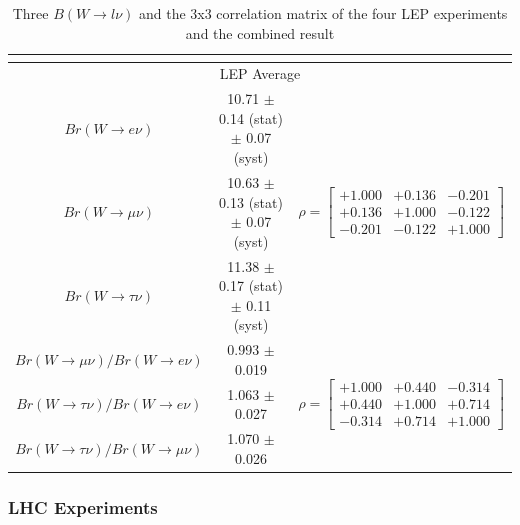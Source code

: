 \begin{table}[ht]
\begin{tabular}{ |c| c  c | }
         \multicolumn{3}{c}{} \\
         \hline
         \multicolumn{3}{|c|}{LEP Average \cite{Schael:2013ita}} \\
         \hline
         $Br(W\to e    \nu)$    & 10.71 $\pm$ 0.14 (stat) $\pm$ 0.07 (syst) & 
         \multirow{3}{*}{
            \begin{footnotesize}
            $\rho = \begin{bmatrix}
                +1.000 &+0.136 &-0.201 \\ 
                +0.136 &+1.000 &-0.122 \\
                -0.201 &-0.122 &+1.000 
            \end{bmatrix}$ 
            \end{footnotesize} 
         } \\
         $Br(W\to \mu  \nu)$    & 10.63 $\pm$ 0.13 (stat) $\pm$ 0.07 (syst) & \\ 
         $Br(W\to \tau \nu)$    & 11.38 $\pm$ 0.17 (stat) $\pm$ 0.11 (syst) & \\
         \hline
         $Br(W\to \mu  \nu)/ Br(W\to e \nu)$ & 0.993  $\pm$ 0.019 & 
         \multirow{3}{*}{
            \begin{footnotesize}
            $\rho = \begin{bmatrix}
                +1.000 &+0.440 &-0.314 \\ 
                +0.440 &+1.000 &+0.714 \\
                -0.314 &+0.714 &+1.000 
            \end{bmatrix}$ 
            \end{footnotesize} 
         } \\
         $Br(W\to \tau \nu)/ Br(W\to e \nu)$ & 1.063  $\pm$ 0.027 & \\
         $Br(W\to \tau \nu)/ Br(W\to\mu\nu)$ & 1.070  $\pm$ 0.026 &  \\
         
         \hline
    \end{tabular}
    \caption{Three $B(W\to l \nu)$ and the 3x3 correlation matrix of the four LEP experiments and the combined result \cite{Schael:2013ita}}
    \label{tab:relatedWorks:lu:W:lep}
\end{table}


\subsubsection{LHC Experiments}

